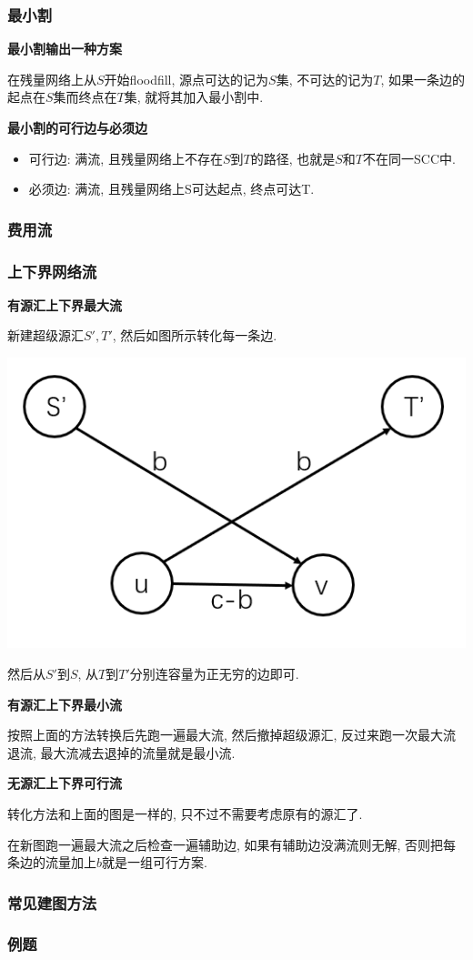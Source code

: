 \subsubsection{最小割}

\textbf{最小割输出一种方案}

在残量网络上从$S$开始floodfill, 源点可达的记为$S$集, 不可达的记为$T$, 如果一条边的起点在$S$集而终点在$T$集, 就将其加入最小割中.

\textbf{最小割的可行边与必须边}

\begin{itemize}
	\item 可行边: 满流, 且残量网络上不存在$S$到$T$的路径, 也就是$S$和$T$不在同一SCC中.

	\item 必须边: 满流, 且残量网络上S可达起点, 终点可达T.
\end{itemize}

\subsubsection{费用流}


\subsubsection{上下界网络流}

\textbf{有源汇上下界最大流}

新建超级源汇$S', T'$, 然后如图所示转化每一条边.

\includegraphics[scale = 0.5]{../src/graph/上下界网络流.png}

然后从$S'$到$S$, 从$T$到$T'$分别连容量为正无穷的边即可.

\textbf{有源汇上下界最小流}

按照上面的方法转换后先跑一遍最大流, 然后撤掉超级源汇, 反过来跑一次最大流退流, 最大流减去退掉的流量就是最小流.

\textbf{无源汇上下界可行流}

转化方法和上面的图是一样的, 只不过不需要考虑原有的源汇了.

在新图跑一遍最大流之后检查一遍辅助边, 如果有辅助边没满流则无解, 否则把每条边的流量加上$b$就是一组可行方案.

\subsubsection{常见建图方法}


\subsubsection{例题}
